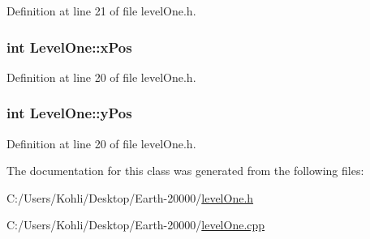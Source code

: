 Definition at line 21 of file levelOne.h.\hypertarget{class_level_one_a5648c256a2bfb5c8f6519227dc14a92a}{
\subsubsection[{xPos}]{\setlength{\rightskip}{0pt plus 5cm}int {\bf LevelOne::xPos}}}
\label{class_level_one_a5648c256a2bfb5c8f6519227dc14a92a}


Definition at line 20 of file levelOne.h.\hypertarget{class_level_one_a6d4af1a9d37892b01d2b193963432325}{
\subsubsection[{yPos}]{\setlength{\rightskip}{0pt plus 5cm}int {\bf LevelOne::yPos}}}
\label{class_level_one_a6d4af1a9d37892b01d2b193963432325}


Definition at line 20 of file levelOne.h.

The documentation for this class was generated from the following files:\begin{DoxyCompactItemize}
\item 
C:/Users/Kohli/Desktop/Earth-\/20000/\hyperlink{level_one_8h}{levelOne.h}\item 
C:/Users/Kohli/Desktop/Earth-\/20000/\hyperlink{level_one_8cpp}{levelOne.cpp}\end{DoxyCompactItemize}
